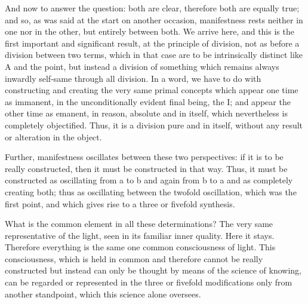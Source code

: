 And now to answer the question:
both are clear, therefore both are equally true;
and so, as was said at the start on another occasion,
manifestness rests neither in one nor in the other,
but entirely between both.
We arrive here, and this is the first important and significant result,
at the principle of division,
not as before a division between two terms,
which in that case are to be
intrinsically distinct like A and the point,
but instead a division of something
which remains always inwardly self-same
through all division.
In a word, we have to do with
constructing and creating
the very same primal concepts
which appear one time as immanent,
in the unconditionally evident final being, the I;
and appear the other time as emanent,
in reason, absolute and in itself,
which nevertheless is completely objectified.
Thus, it is a division pure and in itself,
without any result or alteration in the object.

Further, manifestness oscillates
between these two perspectives:
if it is to be really constructed,
then it must be constructed in that way.
Thus, it must be constructed as oscillating
from a to b and again from b to a and
as completely creating both;
thus as oscillating between the twofold oscillation,
which was the first point,
and which gives rise to a three or fivefold synthesis.

What is the common element in all these determinations?
The very same representative of the light,
seen in its familiar inner quality.
Here it stays.
Therefore everything is the same one common consciousness of light.
This consciousness, which is held in common and
therefore cannot be really constructed but
instead can only be thought by means of the science of knowing,
can be regarded or represented in the three or fivefold modifications only
from another standpoint, which this science alone oversees.
